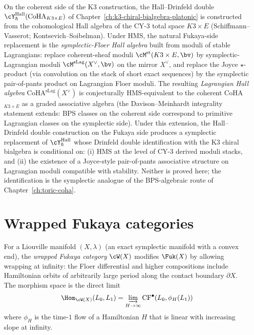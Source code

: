 \begin{remark}
\label{rem:fuk-lagrangian-hall}
On the coherent side of the K3 construction, the Hall--Drinfeld double $\cY^{\mathrm{Hall}}_\hbar(\mathrm{CoHA}_{K3 \times E})$ of Chapter~\ref{ch:k3-chiral-bialgebra-platonic} is constructed from the cohomological Hall algebra of the CY-$3$ total space $K3 \times E$ (Schiffmann--Vasserot; Kontsevich--Soibelman). Under HMS, the natural Fukaya-side replacement is the \emph{symplectic-Floer Hall algebra} built from moduli of stable Lagrangians: replace coherent-sheaf moduli $\cM^{\mathrm{st}}(K3 \times E, \bv)$ by symplectic-Lagrangian moduli $\cM^{\mathrm{sLag}}(X^\vee, \bv)$ on the mirror $X^\vee$, and replace the Joyce $\star$-product (via convolution on the stack of short exact sequences) by the symplectic pair-of-pants product on Lagrangian Floer moduli. The resulting \emph{Lagrangian Hall algebra} $\mathrm{CoHA}^{\mathrm{sLag}}(X^\vee)$ is conjecturally HMS-equivalent to the coherent CoHA$_{K3 \times E}$ as a graded associative algebra (the Davison--Meinhardt integrality statement extends: BPS classes on the coherent side correspond to primitive Lagrangian classes on the symplectic side). Under this extension, the Hall--Drinfeld double construction on the Fukaya side produces a symplectic replacement of $\cY^{\mathrm{Hall}}_\hbar$ whose Drinfeld double identification with the K3 chiral bialgebra is conditional on: (i) HMS at the level of CY-$3$ derived moduli stacks, and (ii) the existence of a Joyce-style pair-of-pants associative structure on Lagrangian moduli compatible with stability. Neither is proved here; the identification is the symplectic analogue of the BPS-algebraic route of Chapter~\ref{ch:toric-coha}.
\end{remark}


\section{Wrapped Fukaya categories}
\label{sec:wrapped-fukaya}

\begin{definition}
\label{def:wrapped-fukaya}
For a Liouville manifold $(X, \lambda)$ (an exact symplectic
manifold with a convex end), the \emph{wrapped Fukaya category}
$\cW(X)$ modifies $\Fuk(X)$ by allowing wrapping at infinity:
the Floer differential and higher compositions include
Hamiltonian orbits of arbitrarily large period along the
contact boundary $\partial X$. The morphism space is the direct
limit
\[
 \Hom_{\cW(X)}(L_0, L_1)
 = \varinjlim_{H \to \infty} \mathrm{CF}^\bullet(L_0, \phi_H(L_1))
\]
where $\phi_H$ is the time-$1$ flow of a Hamiltonian $H$
that is linear with increasing slope at infinity.
\end{definition}

